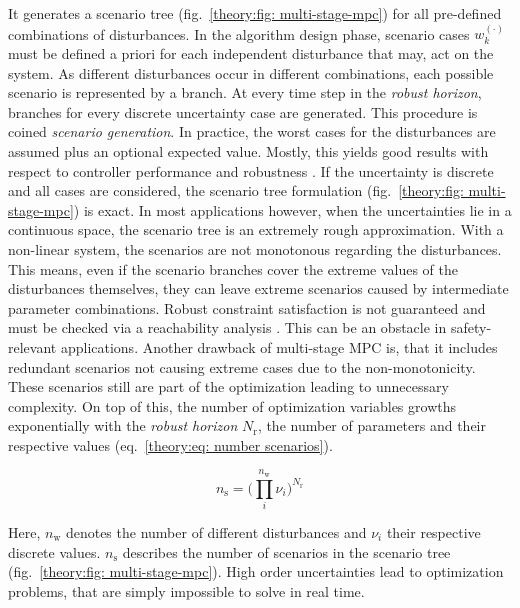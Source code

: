 \noindent
It generates a scenario tree (fig.~\ref{theory:fig: multi-stage-mpc}) for all pre-defined combinations of disturbances.
In the algorithm design phase, scenario cases $w_k^{(\cdot)}$ must be
defined a priori for each independent disturbance that may, act on the system. As different disturbances occur
in different combinations, each possible scenario is represented by a branch. At every time step in the \emph{robust horizon},
branches for every discrete uncertainty case are generated. This procedure is coined \emph{scenario generation}.
In practice, the worst cases for the disturbances are assumed plus an optional expected value. Mostly, this yields good results
with respect to controller performance and robustness \cite{lucia2013}.
\newline
\newline
If the uncertainty is discrete and all cases are considered, the scenario tree formulation (fig.~\ref{theory:fig: multi-stage-mpc}) is exact.
In most applications however, when the uncertainties lie in a continuous space, the scenario tree
is an extremely rough approximation. With a non-linear system, the scenarios are not monotonous regarding the
disturbances. This means, even if the scenario branches cover the extreme values of the disturbances
themselves, they can leave extreme scenarios caused by intermediate parameter combinations. Robust 
constraint satisfaction is not guaranteed and must be checked via a reachability analysis \cite{lucia2015}.
This can be an obstacle in safety-relevant applications.
Another drawback of multi-stage MPC is, that it includes redundant scenarios not causing extreme cases due to 
the non-monotonicity. These scenarios still are part of the optimization leading to unnecessary complexity.
On top of this, the number of optimization variables growths exponentially with the \emph{robust horizon} $N_\text{r}$,
the number of parameters and their respective values (eq.~\ref{theory:eq: number scenarios}). 

\begin{equation}
    \label{theory:eq: number scenarios}
   n_\text{s} = \bigg ( \prod^{n_\text{w}}_i \nu_i \bigg ) ^{N_{\text{r}}}
\end{equation}

\noindent
Here, $n_\text{w}$ denotes the number of different disturbances and $\nu_i$ their respective discrete values. $n_\text{s}$
describes the number of scenarios in the scenario tree (fig.~\ref{theory:fig: multi-stage-mpc}).
High order uncertainties lead to optimization problems, that are simply impossible to solve in real time.



